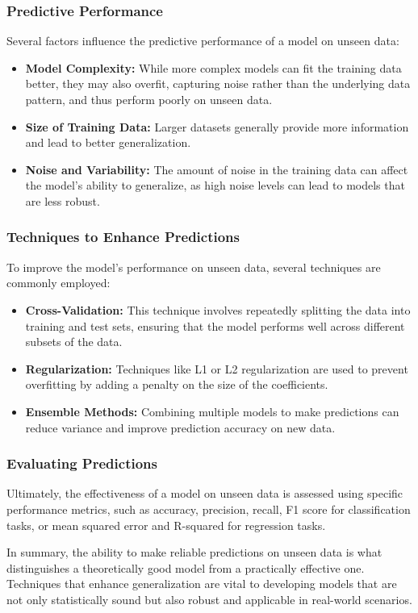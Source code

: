 \subsubsection{Predictive Performance}
Several factors influence the predictive performance of a model on unseen data:
\begin{itemize}
    \item \textbf{Model Complexity:} While more complex models can fit the training data better, they may also overfit, capturing noise rather than the underlying data pattern, and thus perform poorly on unseen data.
    \item \textbf{Size of Training Data:} Larger datasets generally provide more information and lead to better generalization.
    \item \textbf{Noise and Variability:} The amount of noise in the training data can affect the model’s ability to generalize, as high noise levels can lead to models that are less robust.
\end{itemize}

\subsubsection{Techniques to Enhance Predictions}
To improve the model’s performance on unseen data, several techniques are commonly employed:
\begin{itemize}
    \item \textbf{Cross-Validation:} This technique involves repeatedly splitting the data into training and test sets, ensuring that the model performs well across different subsets of the data.
    \item \textbf{Regularization:} Techniques like L1 or L2 regularization are used to prevent overfitting by adding a penalty on the size of the coefficients.
    \item \textbf{Ensemble Methods:} Combining multiple models to make predictions can reduce variance and improve prediction accuracy on new data.
\end{itemize}

\subsubsection{Evaluating Predictions}
Ultimately, the effectiveness of a model on unseen data is assessed using specific performance metrics, such as accuracy, precision, recall, F1 score for classification tasks, or mean squared error and R-squared for regression tasks.

In summary, the ability to make reliable predictions on unseen data is what distinguishes a theoretically good model from a practically effective one. Techniques that enhance generalization are vital to developing models that are not only statistically sound but also robust and applicable in real-world scenarios.

